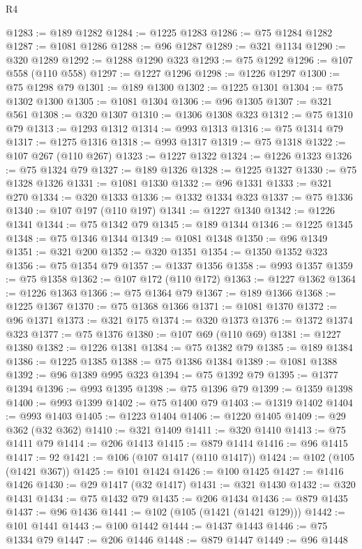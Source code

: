 \begin{lexlean}{R4}
\begin{coremodule}
@1283 := @189 @1282
@1284 := @1225 @1283
@1286 := @75 @1284 @1282
@1287 := @1081 @1286
@1288 := @96 @1287
@1289 := @321 @1134
@1290 := @320 @1289
@1292 := @1288 @1290 @323
@1293 := @75 @1292
@1296 := @107 @558 (@110 @558)
@1297 := @1227 @1296
@1298 := @1226 @1297
@1300 := @75 @1298 @79
@1301 := @189 @1300
@1302 := @1225 @1301
@1304 := @75 @1302 @1300
@1305 := @1081 @1304
@1306 := @96 @1305
@1307 := @321 @561
@1308 := @320 @1307
@1310 := @1306 @1308 @323
@1312 := @75 @1310 @79
@1313 := @1293 @1312
@1314 := @993 @1313
@1316 := @75 @1314 @79
@1317 := @1275 @1316
@1318 := @993 @1317
@1319 := @75 @1318
@1322 := @107 @267 (@110 @267)
@1323 := @1227 @1322
@1324 := @1226 @1323
@1326 := @75 @1324 @79
@1327 := @189 @1326
@1328 := @1225 @1327
@1330 := @75 @1328 @1326
@1331 := @1081 @1330
@1332 := @96 @1331
@1333 := @321 @270
@1334 := @320 @1333
@1336 := @1332 @1334 @323
@1337 := @75 @1336
@1340 := @107 @197 (@110 @197)
@1341 := @1227 @1340
@1342 := @1226 @1341
@1344 := @75 @1342 @79
@1345 := @189 @1344
@1346 := @1225 @1345
@1348 := @75 @1346 @1344
@1349 := @1081 @1348
@1350 := @96 @1349
@1351 := @321 @200
@1352 := @320 @1351
@1354 := @1350 @1352 @323
@1356 := @75 @1354 @79
@1357 := @1337 @1356
@1358 := @993 @1357
@1359 := @75 @1358
@1362 := @107 @172 (@110 @172)
@1363 := @1227 @1362
@1364 := @1226 @1363
@1366 := @75 @1364 @79
@1367 := @189 @1366
@1368 := @1225 @1367
@1370 := @75 @1368 @1366
@1371 := @1081 @1370
@1372 := @96 @1371
@1373 := @321 @175
@1374 := @320 @1373
@1376 := @1372 @1374 @323
@1377 := @75 @1376
@1380 := @107 @69 (@110 @69)
@1381 := @1227 @1380
@1382 := @1226 @1381
@1384 := @75 @1382 @79
@1385 := @189 @1384
@1386 := @1225 @1385
@1388 := @75 @1386 @1384
@1389 := @1081 @1388
@1392 := @96 @1389 @995 @323
@1394 := @75 @1392 @79
@1395 := @1377 @1394
@1396 := @993 @1395
@1398 := @75 @1396 @79
@1399 := @1359 @1398
@1400 := @993 @1399
@1402 := @75 @1400 @79
@1403 := @1319 @1402
@1404 := @993 @1403
@1405 := @1223 @1404
@1406 := @1220 @1405
@1409 := @29 @362 (@32 @362)
@1410 := @321 @1409
@1411 := @320 @1410
@1413 := @75 @1411 @79
@1414 := @206 @1413
@1415 := @879 @1414
@1416 := @96 @1415
@1417 := 92
@1421 := @106 (@107 @1417 (@110 @1417))
@1424 := @102 (@105 (@1421 @367))
@1425 := @101 @1424
@1426 := @100 @1425
@1427 := @1416 @1426
@1430 := @29 @1417 (@32 @1417)
@1431 := @321 @1430
@1432 := @320 @1431
@1434 := @75 @1432 @79
@1435 := @206 @1434
@1436 := @879 @1435
@1437 := @96 @1436
@1441 := @102 (@105 (@1421 (@1421 @129)))
@1442 := @101 @1441
@1443 := @100 @1442
@1444 := @1437 @1443
@1446 := @75 @1334 @79
@1447 := @206 @1446
@1448 := @879 @1447
@1449 := @96 @1448

\end{coremodule}
\end{lexlean}
